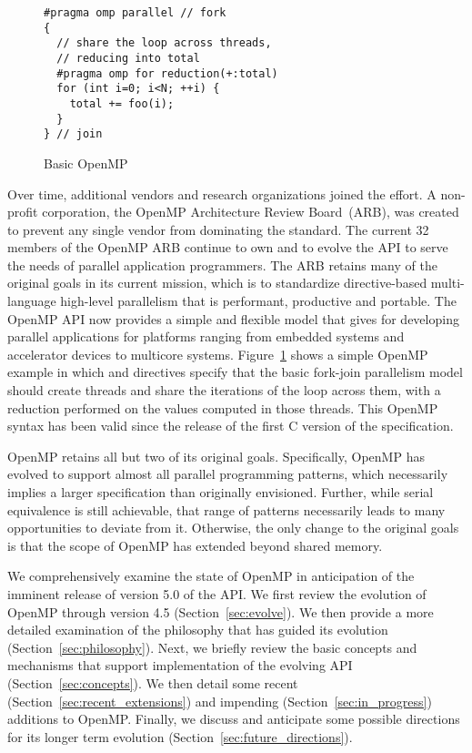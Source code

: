 \begin{figure}
\begin{verbatim}
#pragma omp parallel // fork
{
  // share the loop across threads,
  // reducing into total
  #pragma omp for reduction(+:total)
  for (int i=0; i<N; ++i) {
    total += foo(i);
  }
} // join
\end{verbatim}
\caption{Basic OpenMP\label{fig:basic}}
\end{figure}

Over time, additional vendors and research organizations joined the effort.  A
non-profit corporation, the OpenMP Architecture Review Board~(ARB), was created
to prevent any single vendor from dominating the standard. The current 32
members of the OpenMP ARB continue to own and to evolve the API to serve the
needs of parallel application programmers. The ARB retains many of the original
goals in its current mission, which is to standardize directive-based
multi-language high-level parallelism that is performant, productive and
portable. The OpenMP API now provides a simple and flexible model that gives
for developing parallel applications for platforms ranging from embedded
systems and accelerator devices to multicore systems. Figure~\ref{fig:basic}
shows a simple OpenMP example in which  and 
directives specify that the basic fork-join parallelism model should 
create threads and share the iterations of the loop across them, with 
a reduction performed on the values computed in those threads. This
OpenMP syntax has been valid since the release of the first C version of
the specification.

OpenMP retains all but two of its original goals. Specifically, OpenMP has 
evolved to support almost all parallel programming patterns, which necessarily
implies a larger specification than originally envisioned. Further, while 
serial equivalence is still achievable, that range of patterns necessarily 
leads to many opportunities to deviate from it. Otherwise, the only change 
to the original goals is that the scope of OpenMP has extended beyond 
shared memory. 

We comprehensively examine the state of OpenMP in anticipation of the imminent 
release of version 5.0 of the API. We first review the evolution of OpenMP 
through version 4.5 (Section~\ref{sec:evolve}). We then provide a more 
detailed examination of the philosophy that has guided its evolution 
(Section~\ref{sec:philosophy}). Next, we briefly review the basic concepts 
and mechanisms that support implementation of the evolving API 
(Section~\ref{sec:concepts}). We then detail some recent 
(Section~\ref{sec:recent_extensions}) and impending 
(Section~\ref{sec:in_progress}) additions to OpenMP. Finally, we discuss
and anticipate some possible directions for its longer term evolution
(Section~\ref{sec:future_directions}).
